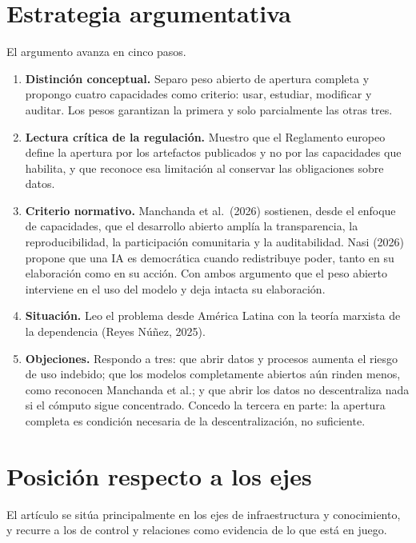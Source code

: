 \documentclass[11pt]{article}
\begin{document}
\section*{Estrategia argumentativa}

El argumento avanza en cinco pasos.

\begin{enumerate}
\item \textbf{Distinción conceptual.} Separo peso abierto de apertura completa y propongo cuatro capacidades como criterio: usar, estudiar, modificar y auditar. Los pesos garantizan la primera y solo parcialmente las otras tres.

\item \textbf{Lectura crítica de la regulación.} Muestro que el Reglamento europeo define la apertura por los artefactos publicados y no por las capacidades que habilita, y que reconoce esa limitación al conservar las obligaciones sobre datos.

\item \textbf{Criterio normativo.} Manchanda et al.\ (2026) sostienen, desde el enfoque de capacidades, que el desarrollo abierto amplía la transparencia, la reproducibilidad, la participación comunitaria y la auditabilidad. Nasi (2026) propone que una IA es democrática cuando redistribuye poder, tanto en su elaboración como en su acción. Con ambos argumento que el peso abierto interviene en el uso del modelo y deja intacta su elaboración.

\item \textbf{Situación.} Leo el problema desde América Latina con la teoría marxista de la dependencia (Reyes Núñez, 2025).

\item \textbf{Objeciones.} Respondo a tres: que abrir datos y procesos aumenta el riesgo de uso indebido; que los modelos completamente abiertos aún rinden menos, como reconocen Manchanda et al.; y que abrir los datos no descentraliza nada si el cómputo sigue concentrado. Concedo la tercera en parte: la apertura completa es condición necesaria de la descentralización, no suficiente.
\end{enumerate}

\section*{Posición respecto a los ejes}

El artículo se sitúa principalmente en los ejes de infraestructura y conocimiento, y recurre a los de control y relaciones como evidencia de lo que está en juego.
\end{document}
